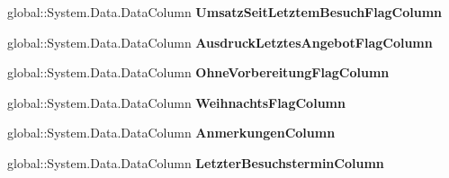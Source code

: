 \begin{DoxyCompactItemize}
\item 
global\+::\+System.\+Data.\+Data\+Column {\bfseries Umsatz\+Seit\+Letztem\+Besuch\+Flag\+Column}\hypertarget{class_products_1_1_data_1_1ds_sage_1_1_kunde_data_table_ad1bd7ad2f030a1d88d2850d847b1925f}{}\label{class_products_1_1_data_1_1ds_sage_1_1_kunde_data_table_ad1bd7ad2f030a1d88d2850d847b1925f}

\item 
global\+::\+System.\+Data.\+Data\+Column {\bfseries Ausdruck\+Letztes\+Angebot\+Flag\+Column}\hypertarget{class_products_1_1_data_1_1ds_sage_1_1_kunde_data_table_a25bb999001e9713186db22647a2e09ff}{}\label{class_products_1_1_data_1_1ds_sage_1_1_kunde_data_table_a25bb999001e9713186db22647a2e09ff}

\item 
global\+::\+System.\+Data.\+Data\+Column {\bfseries Ohne\+Vorbereitung\+Flag\+Column}\hypertarget{class_products_1_1_data_1_1ds_sage_1_1_kunde_data_table_a281e2b0821bd594f97baf8aed805bc72}{}\label{class_products_1_1_data_1_1ds_sage_1_1_kunde_data_table_a281e2b0821bd594f97baf8aed805bc72}

\item 
global\+::\+System.\+Data.\+Data\+Column {\bfseries Weihnachts\+Flag\+Column}\hypertarget{class_products_1_1_data_1_1ds_sage_1_1_kunde_data_table_acde2a8b260410b584782998b68b6b41e}{}\label{class_products_1_1_data_1_1ds_sage_1_1_kunde_data_table_acde2a8b260410b584782998b68b6b41e}

\item 
global\+::\+System.\+Data.\+Data\+Column {\bfseries Anmerkungen\+Column}\hypertarget{class_products_1_1_data_1_1ds_sage_1_1_kunde_data_table_a70d2e2b6d95e193da11e67ae1c706b2e}{}\label{class_products_1_1_data_1_1ds_sage_1_1_kunde_data_table_a70d2e2b6d95e193da11e67ae1c706b2e}

\item 
global\+::\+System.\+Data.\+Data\+Column {\bfseries Letzter\+Besuchstermin\+Column}\hypertarget{class_products_1_1_data_1_1ds_sage_1_1_kunde_data_table_a655534c47e1441f4379b142322ef9ff0}{}\label{class_products_1_1_data_1_1ds_sage_1_1_kunde_data_table_a655534c47e1441f4379b142322ef9ff0}


\end{DoxyCompactItemize}
